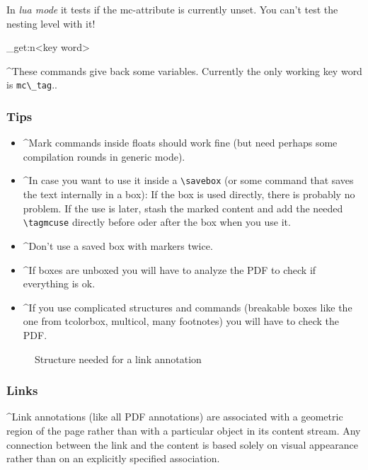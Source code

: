 \documentclass[DIV=12,parskip=half-,bibliography=totoc]{scrartcl}
\newcommand\PDF{PDF}
\begin{document}
\TagP In \emph{lua mode} it tests if the mc-attribute is currently unset. You can't test the nesting level with it!\TagPend

\ExplSyntaxOn
\DescribeMacro{}
\DescribeMacro\tag_get:n{<key word>}
\ExplSyntaxOff

\TagP^These commands give back some variables. Currently the only working key word is \verb+mc\_tag+.\TagPend.



\subsubsection{Tips}

\begin{itemize}
\item \TagP^Mark commands inside floats should work fine (but need perhaps some compilation rounds in generic mode).\Pmeti
\item \TagP^In case you want to use it inside a \verb+\savebox+ (or some command that saves the text internally in a box): If the box is used directly, there is probably no problem. If the use is later, stash the marked content and add the needed \verb+\tagmcuse+ directly  before oder after the box when you use it.\Pmeti
\item \TagP^Don't use a saved box with markers twice.\Pmeti
\item \TagP^If boxes are unboxed you will have to analyze the \PDF{} to check if everything is ok.\Pmeti
\item \TagP^If you use complicated structures and commands (breakable boxes like the one from tcolorbox, multicol, many footnotes) you will have to check the \PDF{}.\Pmeti
 \end{itemize}


\begin{figure}

\tagmcend\tagstructend
{}
\caption{Structure needed for a link annotation}\label{fig:linkannot}
\tagmcend\tagstructend
\end{figure}

\subsubsection{Links}

\TagP^Link annotations (like all \PDF{} annotations) are associated with a geometric region of the page rather than with a particular object in its content stream. Any connection between the link and the content is based solely on visual appearance rather than on an explicitly specified association.\TagPend
\end{document}
